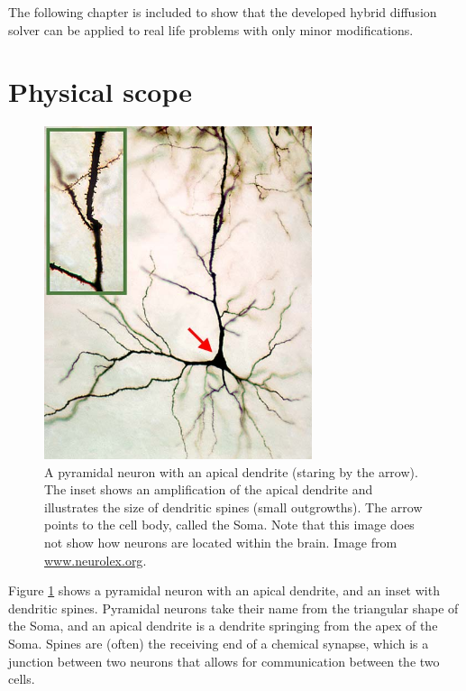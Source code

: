 The following chapter is included to show that the developed hybrid diffusion solver can be applied to real life problems with only minor modifications.

\section{Physical scope}

\begin{figure}[H]
 \centering
 \includegraphics[width=0.7\textwidth]{Figures/Cochlear_nucleus_multipolar_cell.jpg}
 \caption[Pyramidal neuron]{A pyramidal neuron with an apical dendrite (staring by the arrow). The inset shows an amplification of the apical dendrite and illustrates the size of dendritic spines (small outgrowths). The arrow points to the cell body, called the Soma. Note that this image does not show how neurons are located within the brain. Image from \url{www.neurolex.org}.}
 \label{application:pyramidal_neuron}
\end{figure}

Figure \ref{application:pyramidal_neuron} shows a pyramidal neuron with an apical dendrite, and an inset with dendritic spines. 
Pyramidal neurons take their name from the triangular shape of the Soma, and an apical dendrite is a dendrite springing from the apex of the Soma. 
Spines are (often) the receiving end of a chemical synapse, which is a junction between two neurons that allows for communication between the two cells. \\

